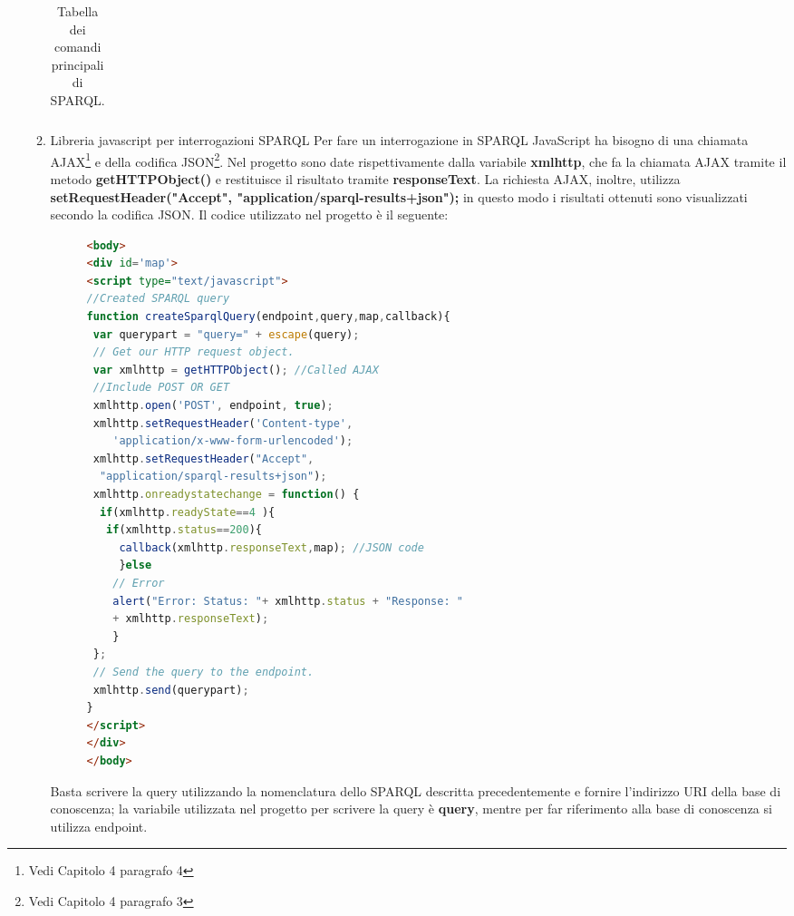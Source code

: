\documentclass[a4paper,11pt]{article}
\begin{document}
\begin{enumerate}
\begin{enumerate}[label*=\arabic*.]
\begin{table}[htb]
\begin{center}
\begin{tabular}{|>{\small}l|>{\small}l|>{\small}l|}
				\hline			
		\end{tabular}	
		\caption{Tabella dei comandi principali di SPARQL.}	
		\end{center}	
\end{table}\newpage
			\item {Libreria javascript per interrogazioni SPARQL}\newline
			Per fare un interrogazione in SPARQL JavaScript ha bisogno di una chiamata AJAX\footnote{Vedi Capitolo 4 paragrafo 4} e della codifica JSON\footnote{Vedi Capitolo 4 paragrafo 3}.
Nel progetto sono date rispettivamente dalla variabile \textbf{xmlhttp}, che fa la chiamata AJAX tramite il metodo \textbf{getHTTPObject()} e restituisce il risultato tramite \textbf{responseText}.
La richiesta AJAX, inoltre, utilizza \newline \textbf{setRequestHeader("Accept", "application/sparql-results+json");} \newline in questo modo i risultati ottenuti sono visualizzati secondo la codifica JSON.
Il codice utilizzato nel progetto è il seguente:
			\begin{figure}[htb]
\begin{lstlisting}[language=HTML, basicstyle=\large]
<body>		
<div id='map'>
<script type="text/javascript">
//Created SPARQL query
function createSparqlQuery(endpoint,query,map,callback){	
 var querypart = "query=" + escape(query);
 // Get our HTTP request object.
 var xmlhttp = getHTTPObject(); //Called AJAX
 //Include POST OR GET
 xmlhttp.open('POST', endpoint, true); 
 xmlhttp.setRequestHeader('Content-type',
 	'application/x-www-form-urlencoded');
 xmlhttp.setRequestHeader("Accept", 
  "application/sparql-results+json");	
 xmlhttp.onreadystatechange = function() {
  if(xmlhttp.readyState==4 ){
   if(xmlhttp.status==200){				
	 callback(xmlhttp.responseText,map); //JSON code
	 }else
	// Error
	alert("Error: Status: "+ xmlhttp.status + "Response: "
	+ xmlhttp.responseText);
	}	
 };
 // Send the query to the endpoint.
 xmlhttp.send(querypart);	
}
</script>
</div>
</body>
\end{lstlisting}
\end{figure}\newline
Basta scrivere la query utilizzando la nomenclatura dello SPARQL descritta precedentemente e fornire l'indirizzo URI della base di conoscenza; la variabile utilizzata nel progetto per scrivere la query è \textbf{query}, mentre per far riferimento alla base di conoscenza si utilizza endpoint.\newpage
		\end{enumerate}

\end{enumerate}
\end{document}
